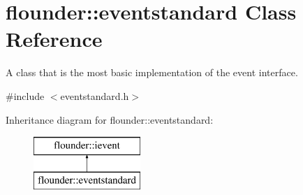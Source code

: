 \hypertarget{classflounder_1_1eventstandard}{}\section{flounder\+:\+:eventstandard Class Reference}
\label{classflounder_1_1eventstandard}


A class that is the most basic implementation of the event interface.  




{\ttfamily \#include $<$eventstandard.\+h$>$}

Inheritance diagram for flounder\+:\+:eventstandard\+:\begin{figure}[H]
\begin{center}
\leavevmode
\includegraphics[height=2.000000cm]{classflounder_1_1eventstandard}
\end{center}
\end{figure}
